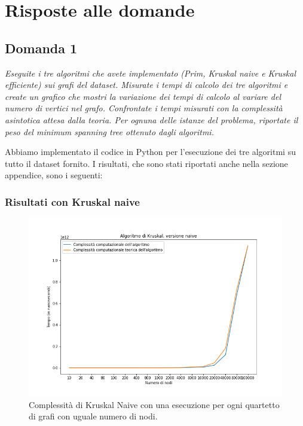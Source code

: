 \section{Risposte alle domande}

\subsection{Domanda 1}

\textit{Eseguite i tre algoritmi che avete implementato (Prim, Kruskal naive e
Kruskal efficiente) sui grafi del dataset. Misurate i tempi di calcolo dei tre algoritmi e
create un grafico che mostri la variazione dei tempi di calcolo al variare del numero di
vertici nel grafo. Confrontate i tempi misurati con la complessità asintotica attesa dalla
teoria. Per ognuna delle istanze del problema, riportate il peso del minimum spanning tree
ottenuto dagli algoritmi.}

Abbiamo implementato il codice in Python per l'esecuzione dei tre algoritmi su tutto il dataset fornito. I risultati, che sono stati riportati anche nella sezione appendice, sono i seguenti:

\subsubsection{Risultati con Kruskal naive}


\begin{figure}[H]
	\centering
	\includegraphics[width=1\textwidth]{res/images/graph-no-rep/kruskal_naive_senza_ripetizioni.png}
    \caption{Complessità di Kruskal Naive con una esecuzione per ogni quartetto di grafi con uguale numero di nodi.}
	\label{fig:kruskalnr}
\end{figure}

